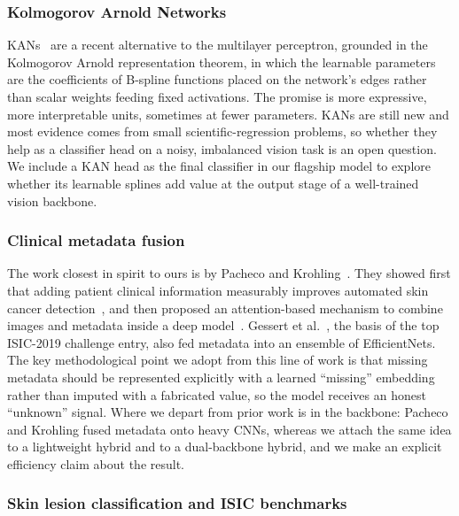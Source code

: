 \subsubsection{Kolmogorov Arnold Networks}

KANs~\cite{liu2024kan} are a recent alternative to the multilayer perceptron,
grounded in the Kolmogorov Arnold representation theorem, in which the learnable
parameters are the coefficients of B-spline functions placed on the network's
edges rather than scalar weights feeding fixed activations. The promise is more
expressive, more interpretable units, sometimes at fewer parameters. KANs are
still new and most evidence comes from small scientific-regression problems, so
whether they help as a classifier head on a noisy, imbalanced vision task is an
open question. We include a KAN head as the final classifier in our flagship
model to explore whether its learnable splines add value at the output stage of
a well-trained vision backbone.

\subsubsection{Clinical metadata fusion}

The work closest in spirit to ours is by Pacheco and
Krohling~\cite{pacheco2020impact,pacheco2021attention}. They showed first that
adding patient clinical information measurably improves automated skin cancer
detection~\cite{pacheco2020impact}, and then proposed an attention-based
mechanism to combine images and metadata inside a deep
model~\cite{pacheco2021attention}. Gessert et al.~\cite{gessert2020ensembles},
the basis of the top ISIC-2019 challenge entry, also fed metadata into an
ensemble of EfficientNets. The key methodological point we adopt from this line
of work is that missing metadata should be represented explicitly with a
learned ``missing'' embedding rather than imputed with a fabricated value,
so the model receives an honest ``unknown'' signal. Where we depart from prior
work is in the backbone: Pacheco and Krohling fused metadata onto heavy CNNs,
whereas we attach the same idea to a lightweight hybrid and to a dual-backbone
hybrid, and we make an explicit efficiency claim about the result.

\subsubsection{Skin lesion classification and ISIC benchmarks}


